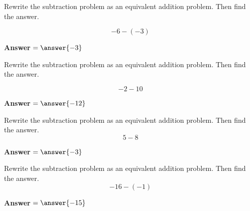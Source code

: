 \documentclass{ximera}[font=12pt]
\begin{document}
\begin{problem}
Rewrite the subtraction problem as an equivalent addition problem.  Then find the answer.

\[ -6 - (-3) \]

\begin{multipleChoice}
\end{multipleChoice}


\textcolor{orange!80!black}{\textbf{Answer}}  $ = \answer{-3}$

\end{problem}


\begin{problem}
Rewrite the subtraction problem as an equivalent addition problem.  Then find the answer.

\[ -2 - 10 \]

\begin{multipleChoice}
\end{multipleChoice}

\textcolor{orange!80!black}{\textbf{Answer}} $ = \answer{-12}$

\end{problem}

\begin{problem} 
Rewrite the subtraction problem as an equivalent addition problem. Then find the answer. 
\[ 5 - 8 \] 
\begin{multipleChoice} 

\end{multipleChoice} 
\textcolor{orange!80!black}{\textbf{Answer}} $ = \answer{-3}$ 
\end{problem}

\begin{problem} 
Rewrite the subtraction problem as an equivalent addition problem. Then find the answer. 
\[ -16 - (-1) \] 
\begin{multipleChoice} 
\end{multipleChoice} 
\textcolor{orange!80!black}{\textbf{Answer}} $ = \answer{-15}$ 
\end{problem}
\end{document}
